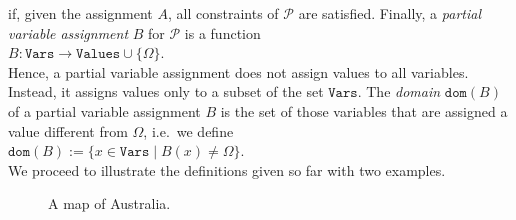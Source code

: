 if, given the assignment $A$, all constraints of $\mathcal{P}$ are satisfied.
Finally, a \emph{\color{blue}partial variable assignment} $B$ for $\mathcal{P}$ is a function
\\[0.2cm]
\hspace*{1.3cm}
$B: \mathtt{Vars} \rightarrow \mathtt{Values} \cup \{ \Omega \}$.
\\[0.2cm]
Hence, a partial variable assignment does not assign values to all variables.  Instead, it assigns values only
to a subset of the set $\mathtt{Vars}$.  The \emph{\color{blue}domain} $\mathtt{dom}(B)$ of a partial variable assignment $B$ is the
set of those variables that are assigned a value different from $\Omega$, i.e.~we define
\\[0.2cm]
\hspace*{1.3cm}
$\mathtt{dom}(B) := \bigl\{ x \in \mathtt{Vars} \mid B(x) \not= \Omega \bigr\}$.
\\[0.2cm]
We proceed to illustrate the definitions given so far with two examples.


\begin{figure}[!ht]
  \centering
  \caption{A map of Australia.}
  \label{fig:australia.pdf}
\end{figure}

